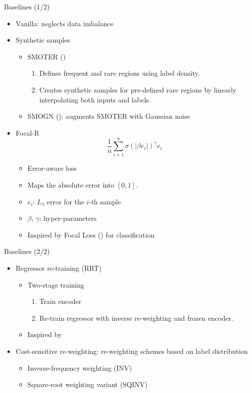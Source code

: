 \begin{frame}{Baselines (1/2)}
	\begin{itemize}\setlength\itemsep{1.5em}
		\item Vanilla: neglects data imbalance
		\item Synthetic samples
		\begin{itemize}
			\item SMOTER (\cite{torgo2013smote})
			\begin{enumerate}
				\item Defines frequent and rare regions using label density.
				\item Creates synthetic samples for pre-defined rare regions by linearly interpolating both inputs and labels.
			\end{enumerate}
			\item SMOGN (\cite{branco2017smogn}): augments SMOTER with Gaussian noise
		\end{itemize}
		\item Focal-R
		\begin{equation*}
			\frac{1}{n} \sum_{i=1}^n \sigma(|\beta e_i|)^\gamma e_i
		\end{equation*}
		\begin{itemize}
			\item Error-aware loss
			\item Maps the absolute error into $[0, 1]$.
			\item $e_i$: $L_1$ error for the $i$-th sample
			\item $\beta$, $\gamma$: hyper-parameters
			\item Inspired by Focal Loss (\cite{lin2017focal}) for classification
		\end{itemize}
	\end{itemize}
\end{frame}

\begin{frame}{Baselines (2/2)}
	\begin{itemize}\setlength\itemsep{1.5em}
		\item Regressor re-training (RRT)
		\begin{itemize}
			\item Two-stage training
			\begin{enumerate}
				\item Train encoder
				\item Re-train regressor with inverse re-weighting and frozen encoder.
			\end{enumerate}
			\item Inspired by \cite{kang2019decoupling}
		\end{itemize}
		\item Cost-sensitive re-weighting: re-weighting schemes based on label distribution
		\begin{itemize}
			\item Inverse-frequency weighting (INV)
			\item Square-root weighting variant (SQINV)
		\end{itemize}
	\end{itemize}
\end{frame}
